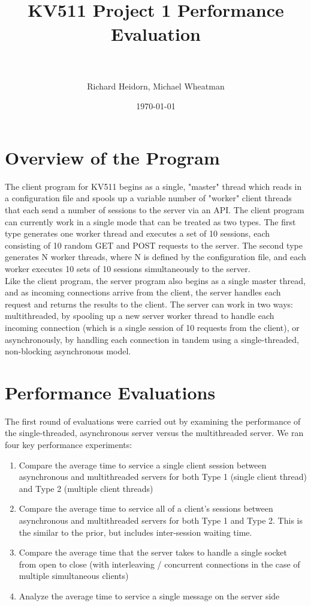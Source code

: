 \documentclass[paper=a4, fontsize=11pt]{scrartcl} %
\title{	
\normalfont \normalsize 
\horrule{1pt} \\[0.1cm] %
	\huge KV511 Project 1 Performance Evaluation  \\ %
\horrule{2pt} \\[0.1cm] %
}
\author{Richard Heidorn, Michael Wheatman}
\date{\normalsize\today} %
\numberwithin{equation}{section} %
\numberwithin{figure}{section} %
\numberwithin{table}{section} %
\begin{document}
\maketitle %


\section{Overview of the Program}

The client program for KV511 begins as a single, "master" thread which reads in a configuration file and spools up a variable number of "worker" client threads that each send a number of sessions to the server via an API. The client program can currently work in a single mode that can be treated as two types. The first type generates one worker thread and executes a set of 10 sessions, each consisting of 10 random GET and POST requests to the server. The second type generates N worker threads, where N is defined by the configuration file, and each worker executes 10 sets of 10 sessions simultaneously to the server.
\\

Like the client program, the server program also begins as a single master thread, and as incoming connections arrive from the client, the server handles each request and returns the results to the client. The server can work in two ways: multithreaded, by spooling up a new server worker thread to handle each incoming connection (which is a single session of 10 requests from the client), or asynchronously, by handling each connection in tandem using a single-threaded, non-blocking asynchronous model.


\section{Performance Evaluations}

The first round of evaluations were carried out by examining the performance of the single-threaded, asynchronous server versus the multithreaded server. We ran four key performance experiments:

\begin{enumerate}
	\item Compare the average time to service a single client session between asynchronous and multithreaded servers for both Type 1 (single client thread) and Type 2 (multiple client threads)
	\item Compare the average time to service all of a client's sessions between asynchronous and multithreaded servers for both Type 1 and Type 2. This is the similar to the prior, but includes inter-session waiting time.
	\item Compare the average time that the server takes to handle a single socket from open to close (with interleaving / concurrent connections in the case of multiple simultaneous clients)
	\item Analyze the average time to service a single message on the server side
\end{enumerate}
\end{document}
